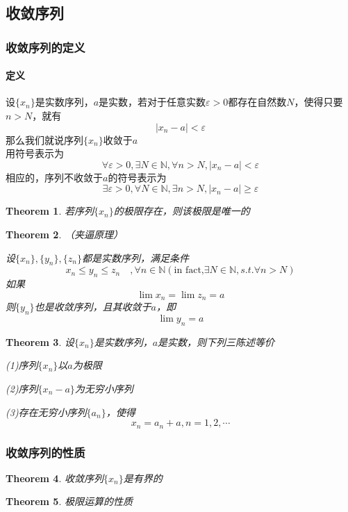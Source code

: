 \documentclass[11pt,hyperref,a4paper,UTF8]{ctexart}
\newtheorem{theorem}{Theorem}[subsection]
\begin{document}
\begin{CJK}{UTF8}{gkai}
\subsection{收敛序列}
\subsubsection{收敛序列的定义}
\paragraph{定义\\}
设$\{x_n\}$是实数序列，$a$是实数，若对于任意实数$\varepsilon > 0$都存在自然数$N$，使得只要$n > N$，就有
\[|x_n-a|<\varepsilon\]
那么我们就说序列$\{x_n\}$收敛于$a$\\

用符号表示为
\[\forall \varepsilon>0,\exists N\in \mathbb{N},\forall n > N, | x_n -a |   <  \varepsilon \]
相应的，序列不收敛于$a$的符号表示为
\[\exists \varepsilon>0,\forall N\in \mathbb{N},\exists n > N, | x_n -a | \geq \varepsilon \]

\begin{theorem}
若序列$\{x_n\}$的极限存在，则该极限是唯一的\\
\end{theorem}

\begin{theorem}（夹逼原理）

设$\{x_n\},\{y_n\},\{z_n\}$都是实数序列，满足条件
\[x_n\leq y_n\leq z_n\quad, \forall n\in \mathbb{N}(\text{in fact,} \exists N\in \mathbb{N},s.t. \forall n >N)\]
如果\[\lim x_n=\lim z_n=a\]
则$\{y_n\}$也是收敛序列，且其收敛于$a$，即
\[\lim_{} y_n = a\]
\end{theorem}

\begin{theorem}
设$\{x_n\}$是实数序列，$a$是实数，则下列三陈述等价

(1)序列$\{x_n\}$以$a$为极限

(2)序列$\{x_n-a\}$为无穷小序列

(3)存在无穷小序列$\{a_n\}$，使得
\[x_n=a_n+a,n=1,2,\cdots\]
\end{theorem}
\subsubsection{收敛序列的性质}
\begin{theorem}
收敛序列$\{x_n\}$是有界的\\
\end{theorem}
\begin{theorem}
  极限运算的性质


\end{theorem}
\end{CJK}
\end{document}
